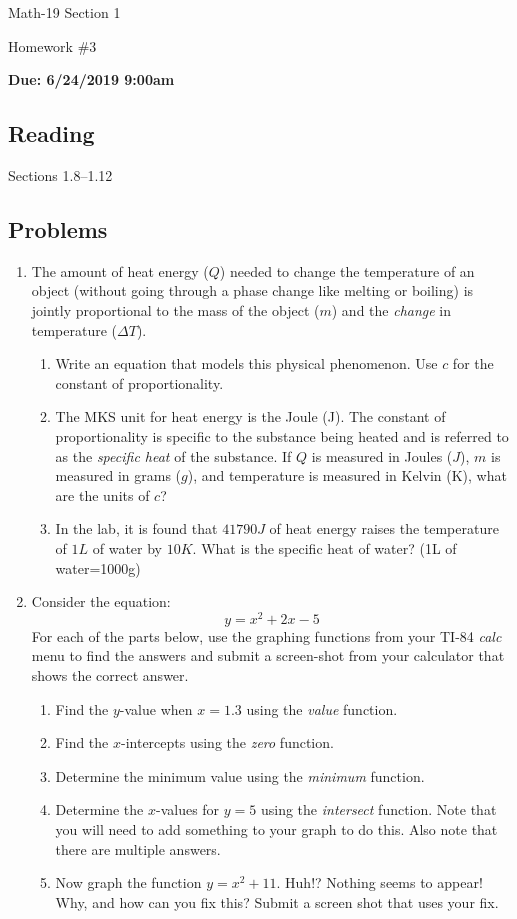 \documentclass[letterpaper,12pt,fleqn]{article}
\begin{document}
\begin{center}
  \large
  Math-19 Section 1

  \Large
  Homework \#3

  \large
  \textbf{Due: 6/24/2019 9:00am}
\end{center}

\subsection*{Reading}

Sections 1.8--1.12

\subsection*{Problems}

\begin{enumerate}
\item The amount of heat energy ($Q$) needed to change the temperature of an
object (without going through a phase change like melting or boiling) is jointly
proportional to the mass of the object ($m$) and the \emph{change} in
temperature ($\Delta T$).
\begin{enumerate}
\item Write an equation that models this physical phenomenon. Use $c$ for the
constant of proportionality.
\item The MKS unit for heat energy is the Joule (J). The constant of
proportionality is specific to the substance being heated and is referred to as
the \emph{specific heat} of the substance. If $Q$ is measured in Joules ($J$),
$m$ is measured in grams ($g$), and temperature is measured in Kelvin (K), what
are the units of $c$?
\item In the lab, it is found that $41790J$ of heat energy raises the
temperature of $1L$ of water by $10K$. What is the specific heat of water?
(1L of water=1000g)
\end{enumerate}

\item Consider the equation:
\[y=x^2+2x-5\]
For each of the parts below, use the graphing functions from your TI-84 \emph{calc} menu to find the answers and
submit a screen-shot from your calculator that shows the correct answer.
\begin{enumerate}
\item Find the $y$-value when $x=1.3$ using the \emph{value} function.
\item Find the $x$-intercepts using the \emph{zero} function.
\item Determine the minimum value using the \emph{minimum} function.
\item Determine the $x$-values for $y=5$ using the \emph{intersect} function.
Note that you will need to add something to your graph to do this. Also note
that there are multiple answers.
\item Now graph the function $y=x^2+11$. Huh!? Nothing seems to appear! Why,
and how can you fix this? Submit a screen shot that uses your fix.
\end{enumerate}
\end{enumerate}
\end{document}
